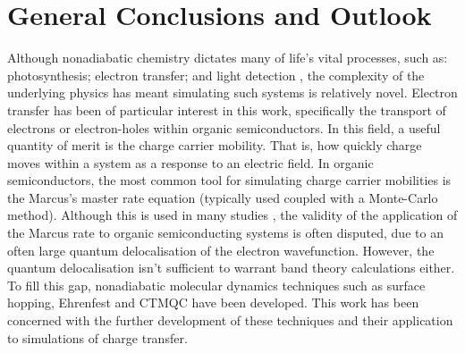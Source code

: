 \chapter{General Conclusions and Outlook}
\label{chap:outlook}
Although nonadiabatic chemistry dictates many of life's vital processes, such as: photosynthesis; electron transfer; and light detection \cite{Dral2018}, the complexity of the underlying physics has meant simulating such systems is relatively novel. Electron transfer has been of particular interest in this work, specifically the transport of electrons or electron-holes within organic semiconductors. In this field, a useful quantity of merit is the charge carrier mobility. That is, how quickly charge moves within a system as a response to an electric field. In organic semiconductors, the most common tool for simulating charge carrier mobilities is the Marcus's master rate equation (typically used coupled with a Monte-Carlo method). Although this is used in many studies \cite{Marcus1, Marcus2, Marcus3, Marcus4, Marcus5, Marcus6, Marcus7, Marcus8}, the validity of the application of the Marcus rate to organic semiconducting systems is often disputed, due to an often large quantum delocalisation of the electron wavefunction. However, the quantum delocalisation isn't sufficient to warrant band theory calculations either. To fill this gap, nonadiabatic molecular dynamics techniques such as surface hopping, Ehrenfest and CTMQC have been developed. This work has been concerned with the further development of these techniques and their application to simulations of charge transfer.
\\\\
